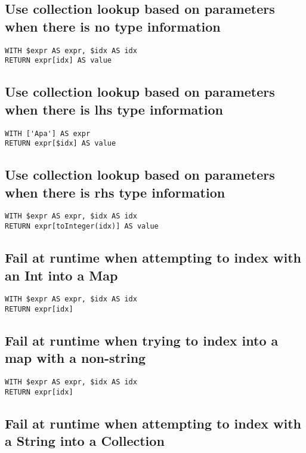\subsection{Use collection lookup based on parameters when there is no type information}

\begin{lstlisting}
WITH $expr AS expr, $idx AS idx
RETURN expr[idx] AS value
\end{lstlisting}

\subsection{Use collection lookup based on parameters when there is lhs type information}

\begin{lstlisting}
WITH ['Apa'] AS expr
RETURN expr[$idx] AS value
\end{lstlisting}

\subsection{Use collection lookup based on parameters when there is rhs type information}

\begin{lstlisting}
WITH $expr AS expr, $idx AS idx
RETURN expr[toInteger(idx)] AS value
\end{lstlisting}

\subsection{Fail at runtime when attempting to index with an Int into a Map}

\begin{lstlisting}
WITH $expr AS expr, $idx AS idx
RETURN expr[idx]
\end{lstlisting}

\subsection{Fail at runtime when trying to index into a map with a non-string}

\begin{lstlisting}
WITH $expr AS expr, $idx AS idx
RETURN expr[idx]
\end{lstlisting}

\subsection{Fail at runtime when attempting to index with a String into a Collection}

